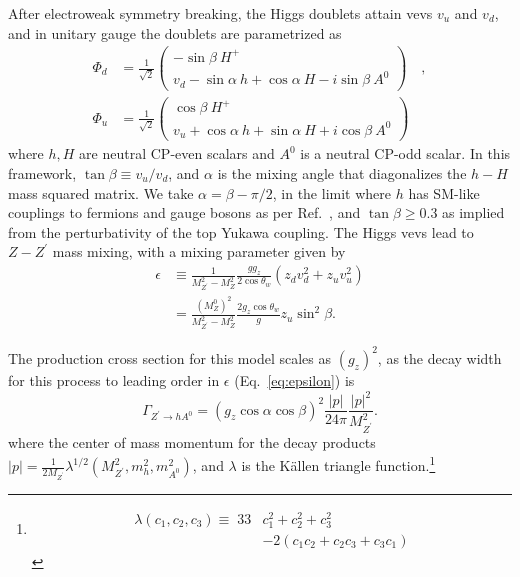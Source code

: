  After electroweak symmetry breaking, the Higgs doublets attain vevs $v_u$ and $v_d$, and in unitary gauge the doublets are parametrized as
 \begin{align}
 \Phi_d &= \frac{1}{\sqrt{2}}
 \begin{pmatrix}
 -\sin{\beta} \ H^+ \\ v_d - \sin{\alpha} \ h + \cos{\alpha} \ H - i \sin{\beta} \ A^0
 \end{pmatrix} 
 \quad , \nonumber \\
 \Phi_u &= \frac{1}{\sqrt{2}}
 \begin{pmatrix}
 \cos{\beta} \ H^+ \\ v_u + \cos{\alpha} \ h + \sin{\alpha} \ H + i \cos{\beta} \ A^0
 \end{pmatrix}
 \end{align}
 where $h,H$ are neutral CP-even scalars and $A^0$ is a neutral CP-odd scalar. 
 In this framework, $\tan{\beta} \equiv v_u/v_d$, and $\alpha$ is the mixing angle that diagonalizes 
 the $h - H$ mass squared matrix. 
We take $\alpha = \beta - \pi/2$, in the 
limit where $h$ has SM-like couplings to fermions and 
gauge bosons as per Ref.~\cite{Craig:2013hca}, and $\tan{\beta} \ge 0.3$ 
as implied from the perturbativity of the top Yukawa coupling. 
The Higgs vevs lead to $Z-Z^\prime$ mass mixing, with a mixing parameter given by 
 \begin{align}
 \epsilon & \equiv \frac{1}{M_{Z^\prime}^2 - M_Z^2} \frac{g g_z}{2 \cos{\theta_w}} ( z_d v_d^2 + z_u v_u^2) \nonumber \\
 & =  \frac{(M_Z^0)^2}{M_{Z^\prime}^2 - M_Z^2} \frac{2 g_z \cos \theta_w}{g}  z_u \sin^2 \beta.
 \label{eq:epsilon}
 \quad
 \end{align}
  
The production cross section for this model scales as $(g_z)^2$, as the decay width for this process
to leading order in $\epsilon$ (Eq.~\ref{eq:epsilon}) is
\begin{equation}
\Gamma_{Z^\prime \to h A^0} =  (g_z \cos \alpha \cos \beta)^2 \frac{|p|}{24 \pi} \frac{|p|^2}{M_{Z^\prime}^2}.
\end{equation}
where the center of mass momentum for the decay products $|p| =
\frac{1}{2 M_{Z^\prime}} \lambda^{1/2}(M_{Z^\prime}^2,m_h^2, m_{A^0}^2)$, and
$\lambda$ is the K\"{a}llen triangle function.\footnote{\begin{align*}\lambda(c_1,c_2,c_3) \equiv\;33& c_1^2 + c_2^2 + c_3^2\\ &- 2(c_1 c_2 + c_2 c_3 + c_3 c_1)\end{align*}}
   
